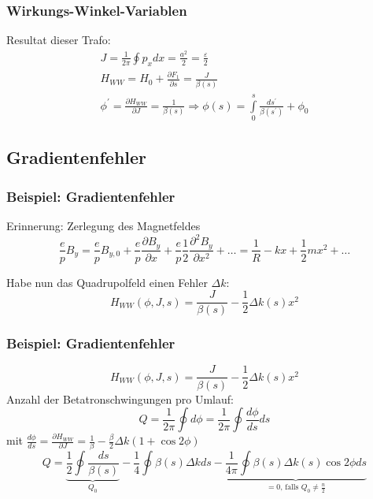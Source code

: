 \documentclass[hyperref={pdfpagelabels=false}]{beamer}
\begin{document}
\begin{frame}
\frametitle{Wirkungs-Winkel-Variablen}
Resultat dieser Trafo:
\begin{gather*}
J = \frac{1}{2\pi} \oint p_x dx= \frac{a^2}{2} = \frac{\varepsilon}{2}\\
H_{WW} = H_0 + \frac{\partial F_1}{\partial s} =  \frac{J}{\beta(s)}\\
\phi^\prime = \frac{\partial H_{WW}}{\partial J} = \frac{1}{\beta(s)} \Rightarrow \phi(s) = \int\limits_{0}^s \frac{ds^\prime}{\beta(s^\prime)} + \phi_0
\end{gather*}
\end{frame}


\subsection{Gradientenfehler}
\begin{frame}
\frametitle{Beispiel: Gradientenfehler}

Erinnerung: Zerlegung des Magnetfeldes
\begin{equation*}
\frac{e}{p}B_y = \frac{e}{p}B_{y,0} + \frac{e}{p}\frac{\partial B_y}{\partial x} + \frac{e}{p}\frac{1}{2}\frac{\partial^2 B_y}{\partial x^2} + \dots = \frac{1}{R} - kx + \frac{1}{2} mx^2 + \dots
\end{equation*}
\pause

\vspace*{.6cm}
Habe nun das Quadrupolfeld einen Fehler $\Delta k$:
\begin{equation*}
H_{WW}(\phi,J,s) = \frac{J}{\beta(s)} - \frac{1}{2}\Delta k(s) x^2
\end{equation*}

\end{frame}
\begin{frame}
\frametitle{Beispiel: Gradientenfehler}
\begin{equation*}
H_{WW}(\phi,J,s) = \frac{J}{\beta(s)} - \frac{1}{2}\Delta k(s) x^2
\end{equation*}
Anzahl der Betatronschwingungen pro Umlauf:
\begin{equation*}
Q = \frac{1}{2\pi}\oint d\phi = \frac{1}{2\pi} \oint \frac{d\phi}{ds} ds
\end{equation*}
mit $\frac{d\phi}{ds} = \frac{\partial H_{WW}}{\partial J} = \frac{1}{\beta} - \frac{\beta}{2}\Delta k (1+\cos 2\phi)$
\pause
\begin{equation*}
Q = \underbrace{\frac{1}{2}\oint \frac{ds}{\beta(s)}}_{Q_0} - \frac{1}{4}\oint \beta(s) \Delta k ds - \underbrace{\frac{1}{4\pi}\oint\beta(s) \Delta k(s) \cos 2\phi ds}_{ = 0\text{, falls } Q_0 \neq \frac{n}{2}}
\end{equation*}
\end{frame}
\end{document}
